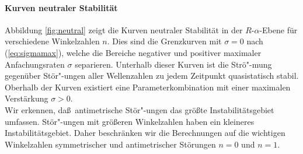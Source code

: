 \documentclass[10pt,a5paper,oneside,draft]{book}
\numberwithin{equation}{chapter}
\begin{document}
\paragraph{Kurven neutraler Stabilit\"at}
Abbildung \ref{fig:neutral} zeigt die Kurven neutraler Stabilit\"at in der $R$-$\alpha$-Ebene f\"ur verschiedene Winkelzahlen $n$.
Dies sind die Grenzkurven mit $\sigma=0$ nach (\mbox{\ref{eq:sigmamax}}), welche die Bereiche negativer und positiver maximaler Anfachungsraten $\sigma$ separieren.
Unterhalb dieser Kurven ist die Str\"o"-mung gegen\"uber St\"or"-ungen aller Wellenzahlen zu jedem Zeitpunkt quasistatisch stabil.
Oberhalb der Kurven existiert eine Parameterkombination mit einer maximalen Verst\"arkung $\sigma > 0$.\\
Wir erkennen, da\ss\ antimetrische St\"or"-ungen das gr\"o\ss te Instabilit\"atsgebiet umfassen.
St\"or"-ungen mit gr\"o\ss eren Winkelzahlen haben ein kleineres Instabilit\"atsgebiet.
Daher beschr\"anken wir die Berechnungen auf die wichtigen Winkelzahlen symmetrischer und antimetrischer St\"orungen $n=0$ und $n=1$.\\
\end{document}
